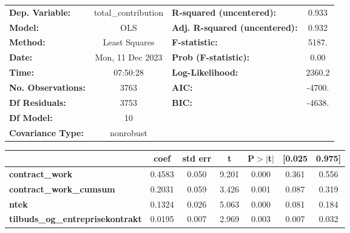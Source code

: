 \begin{center}
\begin{tabular}{lclc}
\toprule
\textbf{Dep. Variable:}                  & total\_contribution & \textbf{  R-squared (uncentered):}      &     0.933   \\
\textbf{Model:}                          &         OLS         & \textbf{  Adj. R-squared (uncentered):} &     0.932   \\
\textbf{Method:}                         &    Least Squares    & \textbf{  F-statistic:       }          &     5187.   \\
\textbf{Date:}                           &   Mon, 11 Dec 2023  & \textbf{  Prob (F-statistic):}          &     0.00    \\
\textbf{Time:}                           &       07:50:28      & \textbf{  Log-Likelihood:    }          &    2360.2   \\
\textbf{No. Observations:}               &          3763       & \textbf{  AIC:               }          &    -4700.   \\
\textbf{Df Residuals:}                   &          3753       & \textbf{  BIC:               }          &    -4638.   \\
\textbf{Df Model:}                       &            10       & \textbf{                     }          &             \\
\textbf{Covariance Type:}                &      nonrobust      & \textbf{                     }          &             \\
\bottomrule
\end{tabular}
\begin{tabular}{lcccccc}
                                         & \textbf{coef} & \textbf{std err} & \textbf{t} & \textbf{P$> |$t$|$} & \textbf{[0.025} & \textbf{0.975]}  \\
\midrule
\textbf{contract\_work}                  &       0.4583  &        0.050     &     9.201  &         0.000        &        0.361    &        0.556     \\
\textbf{contract\_work\_cumsum}          &       0.2031  &        0.059     &     3.426  &         0.001        &        0.087    &        0.319     \\
\textbf{ntek}                            &       0.1324  &        0.026     &     5.063  &         0.000        &        0.081    &        0.184     \\
\textbf{tilbuds\_og\_entreprisekontrakt} &       0.0195  &        0.007     &     2.969  &         0.003        &        0.007    &        0.032     \\

\end{tabular}
\end{center}
